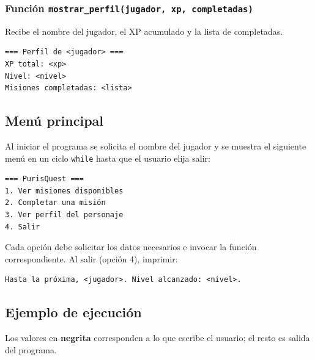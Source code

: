 \subsubsection*{Función \texttt{mostrar\_perfil(jugador, xp, completadas)}}

Recibe el nombre del jugador, el XP acumulado y la lista de completadas.

\begin{verbatim}
=== Perfil de <jugador> ===
XP total: <xp>
Nivel: <nivel>
Misiones completadas: <lista>
\end{verbatim}

\subsection*{{\small \faList}\; Menú principal}

Al iniciar el programa se solicita el nombre del jugador y se muestra el siguiente menú en un ciclo \texttt{while} hasta que el usuario elija salir:

\begin{verbatim}
=== PurisQuest ===
1. Ver misiones disponibles
2. Completar una misión
3. Ver perfil del personaje
4. Salir
\end{verbatim}

Cada opción debe solicitar los datos necesarios e invocar la función correspondiente.
Al salir (opción 4), imprimir:

\begin{verbatim}
Hasta la próxima, <jugador>. Nivel alcanzado: <nivel>.
\end{verbatim}

\subsection*{{\small \faPlay}\; Ejemplo de ejecución}

Los valores en \textbf{negrita} corresponden a lo que escribe el usuario; el resto es salida del programa.


